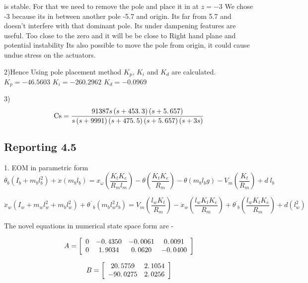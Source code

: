 \documentclass[11pt]{article}
\begin{document}
is stable.
For that we need to remove the pole and place it in at $z = -3$
We chose -3 because its in between another pole -5.7 and origin. Its far from 5.7 and doesn't interfere with that dominant pole. Its under dampening features are useful. Too close to the zero and it will be be close to Right hand plane and potential instability
Its also possible to move the pole from origin, it could cause undue stress on the actuators.

2)Hence Using pole placement method $K_p$, $K_i$ and $K_d$ are calculated.
$K_p = -46.5603$
$K_i = -260.2962$
$K_d = -0.0969$

3)
$$\mathrm{Cs}=\frac{91387s\left(s+453\ldotp 3\right)\left(s+5\ldotp 657\right)}{s\left(s+9991\right)\left(s+475\ldotp 5\right)\left(s+5\ldotp 657\right)\left(s+3s\right)}$$


\subsection*{Reporting 4.5}
1. EOM in parametric form
$$\ddot{\theta_b} \left(I_b +m_b l_b^2 \right)+\ddot{x}\left(m_b l_b \right)=x_{\omega } \left(\frac{K_t K_e }{R_m l_m }\right)-\theta \left(\frac{K_t K_e }{R_m }\right)-\theta \left(m_b l_b g\right)-V_m \left(\frac{K_t }{R_m }\right)+d\;l_b$$

$${\ddot{x} }_w \left(I_w +m_w l_w^2 +m_b l_w^2 \right)+{\theta^¨ }_b \left(m_b l_w^2 l_b \right)=V_m \left(\frac{l_w K_t }{R_m }\right)-{\dot{x} }_w \left(\frac{l_w K_t K_e }{R_m }\right)+{\theta^˙ }_b \left(\frac{l_w K_t K_e }{R_m }\right)+d\left(l_w^2 \right)$$

\begin{par}
\begin{flushleft}
The novel equations in numerical state space form are - 
\end{flushleft}
\end{par}

\begin{par}
$$A=\left\lbrack \begin{array}{cccc}\linebreak 
0 & -0\ldotp 4350 & -0\ldotp 0061 & 0\ldotp 0091\\\linebreak 
0 & 1\ldotp 9034 & 0\ldotp 0620 & -0\ldotp 0400\linebreak 
\end{array}\right\rbrack$$
\end{par}

\begin{par}
$$B=\left\lbrack \begin{array}{cc}\linebreak 
20\ldotp 5759 & 2\ldotp 1054\\\linebreak 
-90\ldotp 0275 & 2\ldotp 0256\linebreak 
\end{array}\right\rbrack$$
\end{par}
\end{document}
